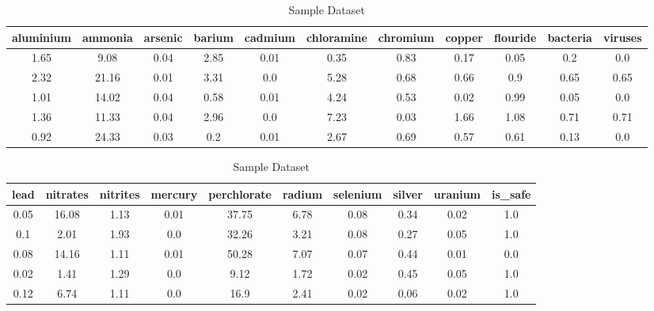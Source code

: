\documentclass[conference]{IEEEtran}
\begin{document}
  \begin{table}[htbp]
    \caption{Sample Dataset}
    \label{table:dataset}
    \centering
    \begin{tabular}{c c c c c c c c c c c }
        \hline 
        \bfseries aluminium & \bfseries ammonia & \bfseries arsenic & \bfseries barium & \bfseries cadmium & \bfseries chloramine & \bfseries chromium & \bfseries copper & \bfseries flouride & \bfseries bacteria & \bfseries viruses \\
        \hline  \hline
          1.65 & 9.08 & 0.04 & 2.85 & 0.01 & 0.35 & 0.83 & 0.17 & 0.05 & 0.2 & 0.0\\
          2.32 & 21.16 & 0.01 & 3.31 & 0.0 & 5.28 & 0.68 & 0.66 & 0.9 & 0.65 & 0.65\\ 
          1.01 & 14.02 & 0.04 & 0.58 & 0.01 & 4.24 & 0.53 & 0.02 & 0.99 & 0.05 & 0.0\\ 
          1.36 & 11.33 & 0.04 & 2.96 & 0.0 & 7.23 & 0.03 & 1.66 & 1.08 & 0.71 & 0.71\\ 
          0.92 & 24.33 & 0.03 & 0.2 & 0.01 & 2.67 & 0.69 & 0.57 & 0.61 & 0.13 & 0.0\\ 
    \hline
    \end{tabular}
    \quad
    \begin{tabular}{c c c c c c c c c c }
        \hline
         \bfseries lead & \bfseries nitrates & \bfseries nitrites & \bfseries mercury & \bfseries perchlorate & \bfseries radium & \bfseries selenium & \bfseries silver & \bfseries uranium & \bfseries is\_safe \\
        \hline \hline 
        0.05 & 16.08 & 1.13 & 0.01 & 37.75 & 6.78 & 0.08 & 0.34 & 0.02 & 1.0\\
        0.1 & 2.01 & 1.93 & 0.0 & 32.26 & 3.21 & 0.08 & 0.27 & 0.05 & 1.0\\
        0.08 & 14.16 & 1.11 & 0.01 & 50.28 & 7.07 & 0.07 & 0.44 & 0.01 & 0.0\\
        0.02 & 1.41 & 1.29 & 0.0 & 9.12 & 1.72 & 0.02 & 0.45 & 0.05 & 1.0\\
        0.12 & 6.74 & 1.11 & 0.0 & 16.9 & 2.41 & 0.02 & 0.06 & 0.02 & 1.0\\
        \hline
    \end{tabular}
\end{table}

\end{document}
